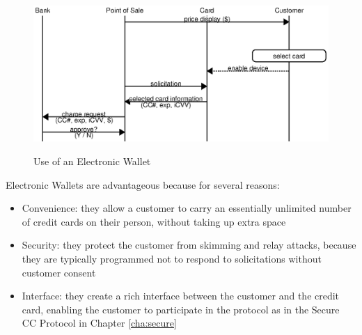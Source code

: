 \begin{figure}[h!]
  \caption{Use of an Electronic Wallet}
  \centering
    \includegraphics{img/wallet.eps}
  \label{fig:wallet}
\end{figure}

Electronic Wallets are advantageous because for several reasons:
\begin{itemize}
\item Convenience: they allow a customer to carry an essentially unlimited number of credit cards on their person, without taking up extra space
\item Security: they protect the customer from skimming and relay attacks, because they are typically programmed not to respond to solicitations without customer consent
\item Interface: they create a rich interface between the customer and the credit card, enabling the customer to participate in the protocol as in the Secure CC Protocol in Chapter \ref{cha:secure}
\end{itemize}
